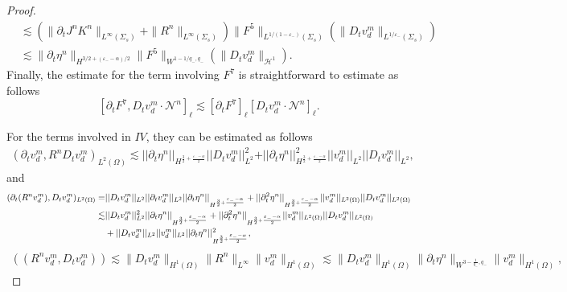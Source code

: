 \documentclass[letterpaper,reqno,10pt,twoside]{amsart}
\theoremstyle{definition}
\theoremstyle{remark}
\def\p{\partial}
\begin{document}
\begin{proof}
\begin{equation}
\begin{aligned}
				&\lesssim (\|\p_tJ^{n}K^{n}\|_{L^\infty(\Sigma_s)}+\|R^{n}\|_{L^\infty(\Sigma_s)})\|F^5\|_{L^{1/(1-\varepsilon_-)}(\Sigma_s)}(\|D_tv_{d}^m\|_{L^{1/\varepsilon_-}(\Sigma_s)})\\
				&\lesssim\|\p_t\eta^{n}\|_{H^{3/2+(\varepsilon_--\alpha)/2}}\|F^5\|_{W^{1-1/q_-, q_-}}(\|D_tv_{d}^m\|_{\mathcal{H}^1}).
			\end{aligned}
		\end{equation}
		Finally, the estimate for the term involving $F^{7}$ is straightforward to estimate as follows 
		\[ [\p_tF^7,D_tv_{d}^m\cdot\mathcal{N}^{n}]_\ell\lesssim [\p_tF^7]_\ell[D_tv_{d}^m\cdot\mathcal{N}^{n}]_\ell.
		\]
		
		
		For the terms involved in $IV$, they can be estimated as follows
		\begin{align}
			(\partial_{t}v_{d}^{m},R^{n}D_{t}v_{d}^{m})_{L^{2}(\Omega)}\lesssim \vert \vert \partial_{t}{\eta}^{n}\vert \vert_{H^{\frac{3}{2}+\frac{\varepsilon_{-}-\alpha}{2}}}\vert \vert D_{t}v_{d}^{m}\vert \vert^{2}_{L^{2}}+\vert \vert \partial_{t}\eta^{n}\vert \vert_{H^{\frac{3}{2}+\frac{\varepsilon_{-}-\alpha}{2}}}^{2}\vert \vert v_{d}^{m}\vert \vert_{L^{2}}\vert \vert D_{t}v_{d}^{m}\vert \vert_{L^{2}},
		\end{align}
		and
		\begin{align}
			(\partial_{t}(R^{n}v_{d}^{m}),D_{t}v_{d}^{m})_{L^{2}(\Omega)}=&\vert \vert D_{t}v_{d}^{m}\vert \vert_{L^{2}}\vert \vert \partial_{t}v_{d}^{m}\vert \vert_{L^{2}}\vert \vert \partial_{t}\eta^{n}\vert \vert_{H^{\frac{3}{2}+\frac{\varepsilon_{-}-\alpha}{2}}}+\vert \vert \partial_{t}^{2}\eta^{n}\vert \vert_{H^{\frac{3}{2}+\frac{\varepsilon_{-}-\alpha}{2}}}\vert \vert v_{d}^{m}\vert \vert_{L^{2}(\Omega)}\vert \vert D_{t}v_{d}^{m}\vert \vert_{L^{2}(\Omega)}\notag\\
			\lesssim& \vert \vert D_{t}v_{d}^{m}\vert \vert^{2}_{L^{2}}\vert \vert \partial_{t}\eta^{n}\vert \vert_{H^{\frac{3}{2}+\frac{\varepsilon_{-}-\alpha}{2}}}+\vert \vert \partial_{t}^{2}\eta^{n}\vert \vert_{H^{\frac{3}{2}+\frac{\varepsilon_{-}-\alpha}{2}}}\vert \vert v_{d}^{m}\vert \vert_{L^{2}(\Omega)}\vert \vert D_{t}v_{d}^{m}\vert \vert_{L^{2}(\Omega)}\notag\\
			&+\vert \vert D_{t}v_{d}^{m}\vert \vert_{L^{2}}\vert \vert v_{d}^{m}\vert \vert_{L^{2}}\vert \vert \partial_{t}\eta^{n}\vert \vert_{H^{\frac{3}{2}+\frac{\varepsilon_{-}-\alpha}{2}}}^{2},
		\end{align}
		\begin{align}
			((R^{n}v_{d}^{m},D_{t}v_{d}^{m}))\lesssim \|D_{t}v_{d}^{m}\|_{H^{1}(\Omega)}\|R^{n}\|_{L^{\infty}}\|v_{d}^{m}\|_{H^{1}(\Omega)}\lesssim \|D_{t}v_{d}^{m}\|_{H^{1}(\Omega)}\|\p_{t}\eta^{n}\|_{W^{3-\frac{1}{q_{-}},q_{-}}}\|v_{d}^{m}\|_{H^{1}(\Omega)},

\end{align}
\end{proof}
\end{document}
